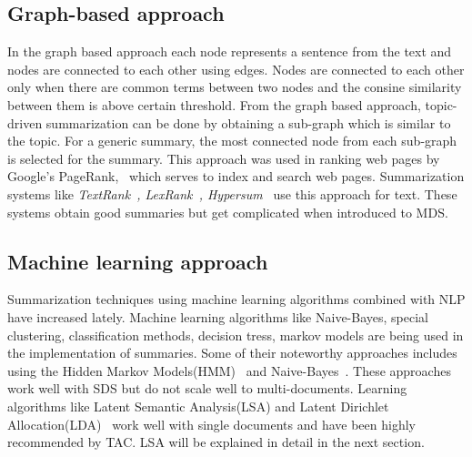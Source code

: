 \subsection{Graph-based approach}
In the graph based approach each node represents a sentence from the text and nodes are connected to each other using edges.
Nodes are connected to each other only when there are common terms between two nodes and the consine similarity between them
is above certain threshold. From the graph based approach, topic-driven summarization can be done by obtaining a sub-graph which
is similar to the topic. For a generic summary, the most connected node from each sub-graph is selected for the summary.
This approach was used in ranking web pages by Google's PageRank,~\cite{pagerank} which serves to index and search web pages.
Summarization systems like \textit{TextRank~\cite{TextRank}, LexRank~\cite{lexrank}, Hypersum~\cite{Wang:2009}} use this approach for text.
These systems obtain good summaries but get complicated when introduced to MDS.

\subsection{Machine learning approach}
Summarization techniques using machine learning algorithms combined with NLP have increased lately. Machine learning algorithms
like Naive-Bayes, special clustering, classification methods, decision tress, markov models are being used in the implementation
of summaries. Some of their noteworthy approaches includes using the Hidden Markov Models(HMM)~\cite{hmm} and Naive-Bayes~\cite{naive-bayes}.
These approaches work well with SDS but do not scale well to multi-documents. Learning algorithms like Latent Semantic Analysis(LSA)
and Latent Dirichlet Allocation(LDA)~\cite{lda-lsa} work well with single documents and have been highly recommended by TAC.
LSA will be explained in detail in the next section.
